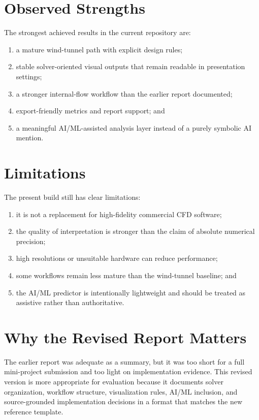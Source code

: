 \documentclass[12pt,a4paper,titlepage]{report}
\begin{document}
\section{Observed Strengths}
The strongest achieved results in the current repository are:
\begin{enumerate}
\item a mature wind-tunnel path with explicit design rules;
\item stable solver-oriented visual outputs that remain readable in presentation settings;
\item a stronger internal-flow workflow than the earlier report documented;
\item export-friendly metrics and report support; and
\item a meaningful AI/ML-assisted analysis layer instead of a purely symbolic AI mention.
\end{enumerate}

\section{Limitations}
The present build still has clear limitations:
\begin{enumerate}
\item it is not a replacement for high-fidelity commercial CFD software;
\item the quality of interpretation is stronger than the claim of absolute numerical precision;
\item high resolutions or unsuitable hardware can reduce performance;
\item some workflows remain less mature than the wind-tunnel baseline; and
\item the AI/ML predictor is intentionally lightweight and should be treated as assistive rather than authoritative.
\end{enumerate}

\section{Why the Revised Report Matters}
The earlier report was adequate as a summary, but it was too short for a full mini-project submission and too light on implementation evidence. This revised version is more appropriate for evaluation because it documents solver organization, workflow structure, visualization rules, AI/ML inclusion, and source-grounded implementation decisions in a format that matches the new reference template.
\end{document}
